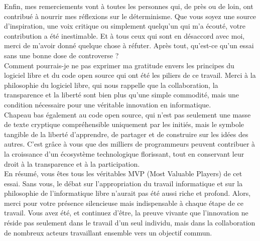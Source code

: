\documentclass[10pt]{book}
\begin{document}
Enfin, mes remerciements vont à toutes les personnes qui, de près ou de loin, ont contribué à nourrir mes réflexions sur le déterminisme. Que vous soyez une source d'inspiration, une voix critique ou simplement quelqu'un qui m'a écouté, votre contribution a été inestimable. Et à tous ceux qui sont en désaccord avec moi, merci de m'avoir donné quelque chose à réfuter. Après tout, qu'est-ce qu'un essai sans une bonne dose de controverse ?\\

Comment pourrais-je ne pas exprimer ma gratitude envers les principes du logiciel libre et du code open source qui ont été les piliers de ce travail. Merci à la philosophie du logiciel libre, qui nous rappelle que la collaboration, la transparence et la liberté sont bien plus qu'une simple commodité, mais une condition nécessaire pour une véritable innovation en informatique.\\

Chapeau bas également au code open source, qui n'est pas seulement une masse de texte cryptique compréhensible uniquement par les initiés, mais le symbole tangible de la liberté d'apprendre, de partager et de construire sur les idées des autres. C'est grâce à vous que des milliers de programmeurs peuvent contribuer à la croissance d'un écosystème technologique florissant, tout en conservant leur droit à la transparence et à la participation.\\

En résumé, vous êtes tous les véritables MVP (Most Valuable Players) de cet essai. Sans vous, le débat sur l'appropriation du travail informatique et sur la philosophie de l'informatique libre n'aurait pas été aussi riche et profond. Alors, merci pour votre présence silencieuse mais indispensable à chaque étape de ce travail. Vous avez été, et continuez d'être, la preuve vivante que l'innovation ne réside pas seulement dans le travail d'un seul individu, mais dans la collaboration de nombreux acteurs travaillant ensemble vers un objectif commun.\\


\end{document}

